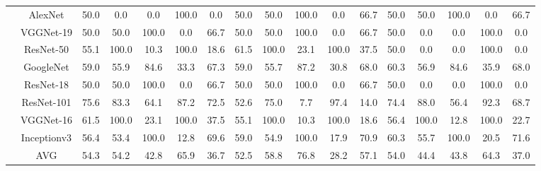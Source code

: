 \documentclass[12pt,italian]{article}
\begin{document}
\begin{tiny}
\begin{longtable}{lcccccccccccccccc}
& AlexNet & 50.0 &  0.0 &  0.0 & 100.0 &  0.0 & 50.0 & 50.0 & 100.0 &  0.0 & 66.7 & 50.0 & 50.0 & 100.0 &  0.0 & 66.7 \\ 
& VGGNet-19 & 50.0 & 50.0 & 100.0 &  0.0 & 66.7 & 50.0 & 50.0 & 100.0 &  0.0 & 66.7 & 50.0 &  0.0 &  0.0 & 100.0 &  0.0 \\ 
& ResNet-50 & 55.1 & 100.0 & 10.3 & 100.0 & 18.6 & 61.5 & 100.0 & 23.1 & 100.0 & 37.5 & 50.0 &  0.0 &  0.0 & 100.0 &  0.0 \\ 
& GoogleNet & 59.0 & 55.9 & 84.6 & 33.3 & 67.3 & 59.0 & 55.7 & 87.2 & 30.8 & 68.0 & 60.3 & 56.9 & 84.6 & 35.9 & 68.0 \\ 
& ResNet-18 & 50.0 & 50.0 & 100.0 &  0.0 & 66.7 & 50.0 & 50.0 & 100.0 &  0.0 & 66.7 & 50.0 &  0.0 &  0.0 & 100.0 &  0.0 \\ 
& ResNet-101 & 75.6 & 83.3 & 64.1 & 87.2 & 72.5 & 52.6 & 75.0 &  7.7 & 97.4 & 14.0 & 74.4 & 88.0 & 56.4 & 92.3 & 68.7 \\ 
& VGGNet-16 & 61.5 & 100.0 & 23.1 & 100.0 & 37.5 & 55.1 & 100.0 & 10.3 & 100.0 & 18.6 & 56.4 & 100.0 & 12.8 & 100.0 & 22.7 \\ 
& Inceptionv3 & 56.4 & 53.4 & 100.0 & 12.8 & 69.6 & 59.0 & 54.9 & 100.0 & 17.9 & 70.9 & 60.3 & 55.7 & 100.0 & 20.5 & 71.6 \\ 
\hline
& AVG & 54.3 & 54.2 & 42.8 & 65.9 & 36.7 & 52.5 & 58.8 & 76.8 & 28.2 & 57.1 & 54.0 & 44.4 & 43.8 & 64.3 & 37.0 \\ 
\hline
\bottomrule
\end{longtable} 

 \pagebreak 
\end{tiny} 
 
\end{document}
